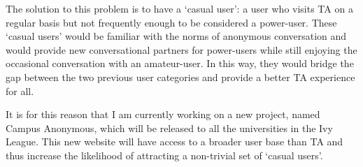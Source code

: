 The solution to this problem is to have a `casual user': a user who visits TA on a regular basis but not frequently enough to be considered a power-user. These `casual users' would be familiar with the norms of anonymous conversation and would provide new conversational partners for power-users while still enjoying the occasional conversation with an amateur-user. In this way, they would bridge the gap between the two previous user categories and provide a better TA experience for all. 

It is for this reason that I am currently working on a new project, named Campus Anonymous, which will be released to all the universities in the Ivy League. This new website will have access to a broader user base than TA and thus increase the likelihood of attracting a non-trivial set of `casual users'.
